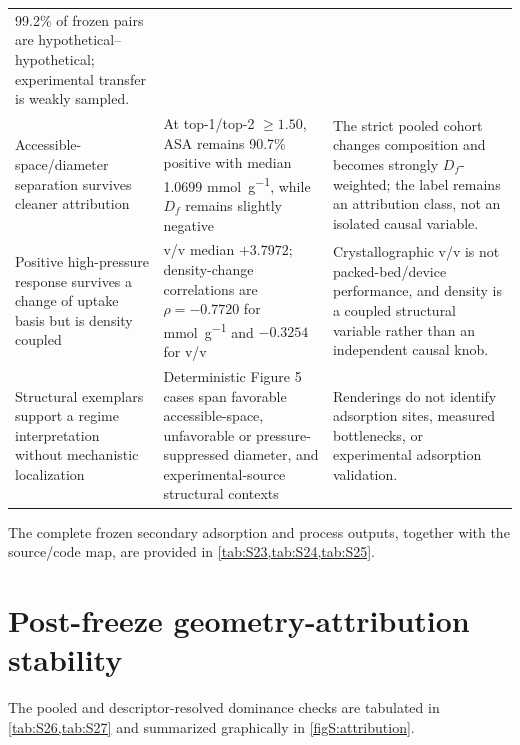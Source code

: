 \documentclass[11pt,a4paper]{article}
\begin{document}
\begin{longtable}{p{}p{}p{}}
99.2\% of frozen pairs are hypothetical--hypothetical; experimental transfer is
weakly sampled. \\
\addlinespace
Accessible-space/diameter separation survives cleaner attribution &
At top-1/top-2 $\geq1.50$, ASA remains 90.7\% positive with median 1.0699
\si{\milli\mole\per\gram}, while $D_f$ remains slightly negative &
The strict pooled cohort changes composition and becomes strongly $D_f$-weighted;
the label remains an attribution class, not an isolated causal variable. \\
\addlinespace
Positive high-pressure response survives a change of uptake basis but is density
coupled &
v/v median $+3.7972$; density-change correlations are $\rho=-0.7720$ for
\si{\milli\mole\per\gram} and $-0.3254$ for v/v &
Crystallographic v/v is not packed-bed/device performance, and density is a coupled
structural variable rather than an independent causal knob. \\
\addlinespace
Structural exemplars support a regime interpretation without mechanistic
localization &
Deterministic Figure 5 cases span favorable accessible-space, unfavorable or
pressure-suppressed diameter, and experimental-source structural contexts &
Renderings do not identify adsorption sites, measured bottlenecks, or experimental
adsorption validation. \\
\bottomrule
\end{longtable}
\endgroup


The complete frozen secondary adsorption and process outputs, together with the
source/code map, are provided in \cref{tab:S23,tab:S24,tab:S25}.

\clearpage
\begin{landscape}
\begingroup
\scriptsize
\setlength{\tabcolsep}{2.5pt}

\endgroup
\end{landscape}
\clearpage


\section{Post-freeze geometry-attribution stability}
\label{sec:attribution}

The pooled and descriptor-resolved dominance checks are tabulated in
\cref{tab:S26,tab:S27} and summarized graphically in \cref{figS:attribution}.
\end{document}
